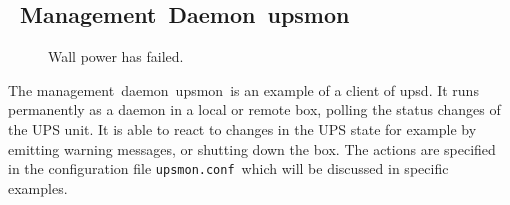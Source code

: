 \documentclass[12pt]{article}
\newlength{\headersep}\setlength{\headersep}{3mm}
\newcommand{\Hsep}{\hspace{\headersep}}
\newcommand{\upsd}{\mbox{\textcolor{UPSDCOLOUR}{upsd}}}
\newcommand{\MD}{\mbox{\textcolor{MONCOLOUR}{Management Daemon}}}
\newcommand{\md}{\mbox{\textcolor{MONCOLOUR}{management daemon}}}
\newcommand{\upsmon}{\mbox{\textcolor{MONCOLOUR}{upsmon}}}
\newcommand{\upsmonconf}{\textcolor{MONCOLOUR}{\texttt{upsmon.conf}}}
\begin{document}
\subsection{\Hsep\ \MD\ \upsmon}\label{section:upsmon}


\begin{figure}[ht]
\vspace{-6mm}
\begin{center}
\end{center}
\vspace{-6mm}
\caption{Wall power has failed.\label{fig:overview-OB}}
\end{figure}

The \md\ \upsmon\ is an example of a client of \upsd.  It runs
permanently as a daemon in a local or remote box, polling the status
changes of the UPS unit.  It is able to react to changes in the UPS
state for example by emitting warning messages, or shutting down the
box.  The actions are specified in the configuration file
\upsmonconf\ which will be discussed in specific examples.
\end{document}
